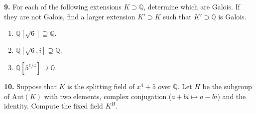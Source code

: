\documentclass[10pt]{amsart}
\theoremstyle{theorem}
\newcommand{\bQ}{\mathbb{Q}}
\begin{document}
\newpage
\noindent
{\bf 9.}  For each of the following extensions $K \supset \bQ$, determine which are Galois.  If they are not Galois, find a larger extension $K' \supset K$ such that $K' \supset \bQ$ is Galois.
\begin{enumerate}
    \item $\bQ[\sqrt{6}] \supseteq \bQ$.
    \item $\bQ[\sqrt{6}, i] \supseteq \bQ$.
    \item $\bQ[5^{1/4}] \supseteq \bQ$.
\end{enumerate}
\newpage
\noindent
{\bf 10.}  Suppose that $K$ is the splitting field of $x^4 + 5$ over $\bQ$.  Let $H$ be the subgroup of $\mathrm{Aut}(K)$ with two elements, complex conjugation ($a + bi\mapsto a - bi$) and the identity.  Compute the fixed field $K^H$.
\end{document}
